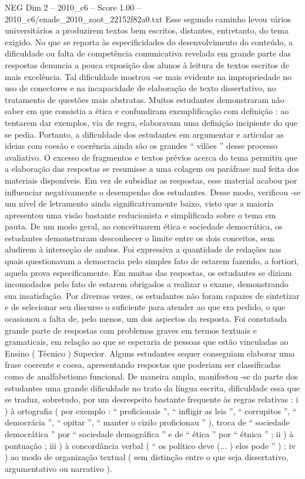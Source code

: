 \begin{textsample}{NEG Dim 2 – 2010\_c6 – Score 1.00 – 2010\_c6/enade\_2010\_zoot\_22152f82a0.txt}
Esse segundo caminho levou vários universitários a produzirem textos bem escritos, distantes, entretanto, do tema exigido.
No que se reporta às especificidades do desenvolvimento do conteúdo, a dificuldade ou falta de competência comunicativa revelada em grande parte das respostas denuncia a pouca exposição dos alunos à leitura de textos escritos de mais excelência.
Tal dificuldade mostrou -se mais evidente na impropriedade no uso de conectores e na incapacidade de elaboração de texto dissertativo, no tratamento de questões mais abstratas.
Muitos estudantes demonstraram não saber em que consistia a ética e confundiram exemplificação com definição : ao tentarem dar exemplos, via de regra, elaboravam uma definição incipiente do que se pedia.
Portanto, a dificuldade dos estudantes em argumentar e articular as ideias com coesão e coerência ainda são os grandes “ vilões ” desse processo avaliativo.
O excesso de fragmentos e textos prévios acerca do tema permitiu que a elaboração das respostas se resumisse a uma colagem ou paráfrase mal feita dos materiais disponíveis.
Em vez de subsidiar as respostas, esse material acabou por influenciar negativamente o desempenho dos estudantes.
Desse modo, verificou -se um nível de letramento ainda significativamente baixo, visto que a maioria apresentou uma visão bastante reducionista e simplificada sobre o tema em pauta.
De um modo geral, ao conceituarem ética e sociedade democrática, os estudantes demonstraram desconhecer o limite entre os dois conceitos, sem aludirem à interseção de ambos.
Foi expressiva a quantidade de redações nas quais questionavam a democracia pelo simples fato de estarem fazendo, a fortiori, aquela prova especificamente.
Em muitas das respostas, os estudantes se diziam incomodados pelo fato de estarem obrigados a realizar o exame, demonstrando sua insatisfação.
Por diversas vezes, os estudantes não foram capazes de sintetizar e de selecionar seu discurso o suficiente para atender ao que era pedido, o que ocasionou a falta de, pelo menos, um dos aspectos da resposta.
Foi constatada grande parte de respostas com problemas graves em termos textuais e gramaticais, em relação ao que se esperaria de pessoas que estão vinculadas ao Ensino ( Técnico ) Superior.
Alguns estudantes sequer conseguiam elaborar uma frase coerente e coesa, apresentando respostas que poderiam ser classificadas como de analfabetismo funcional.
De maneira ampla, manifestou -se da parte dos estudantes uma grande dificuldade no trato da língua escrita, dificuldade essa que se traduz, sobretudo, por um desrespeito bastante frequente às regras relativas : i ) à ortografia ( por exemplo : “ proficionais ”, “ infligir as leis ”, “ corrupitos ”, “ democrácia ”, “ opitar ”, “ manter o cizilo proficionau ” ), troca de “ sociedade democrática ” por “ sociedade demográfica ” e de “ ética ” por “ étnica ” ; ii ) à pontuação ; iii ) à concordância verbal ( “ os político deve (... ) eles pode ” ) ; iv ) ao modo de organização textual ( sem distinção entre o que seja dissertativo, argumentativo ou narrativo ).

\end{textsample}
